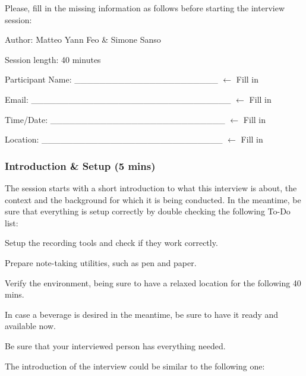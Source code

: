 \vspace{4pt}
Please, fill in the missing information as follows before starting the interview session:

Author: Matteo Yann Feo \& Simone Sanso

Session length: 40 minutes 

Participant Name: \hfill \_\_\_\_\_\_\_\_\_\_\_\_\_\_\_\_\_\_\_\_\_\_\_  $\leftarrow$ Fill in

Email: \hfill \_\_\_\_\_\_\_\_\_\_\_\_\_\_\_\_\_\_\_\_\_\_\_\_\_\_\_\_\_\_\_\_ $\leftarrow$ Fill in

Time/Date: \hfill \_\_\_\_\_\_\_\_\_\_\_\_\_\_\_\_\_\_\_\_\_\_\_\_\_\_\_\_ $\leftarrow$ Fill in

Location: \hfill \_\_\_\_\_\_\_\_\_\_\_\_\_\_\_\_\_\_\_\_\_\_\_\_\_\_\_\_\_ $\leftarrow$ Fill in

\vspace{6pt}
\subsubsection{Introduction \& Setup (5 mins)}

The session starts with a short introduction to what this interview is about, the context and the background for which it is being conducted. In the meantime, be sure that everything is setup correctly by double checking the following To-Do list:

\begin{todolist}
    \item Setup the recording tools and check if they work correctly.
    \item Prepare note-taking utilities, such as pen and paper.
    \item Verify the environment, being sure to have a relaxed location for the following 40 mins.
    \item In case a beverage is desired in the meantime, be sure to have it ready and available now.
    \item Be sure that your interviewed person has everything needed.
\end{todolist}

The introduction of the interview could be similar to the following one:

